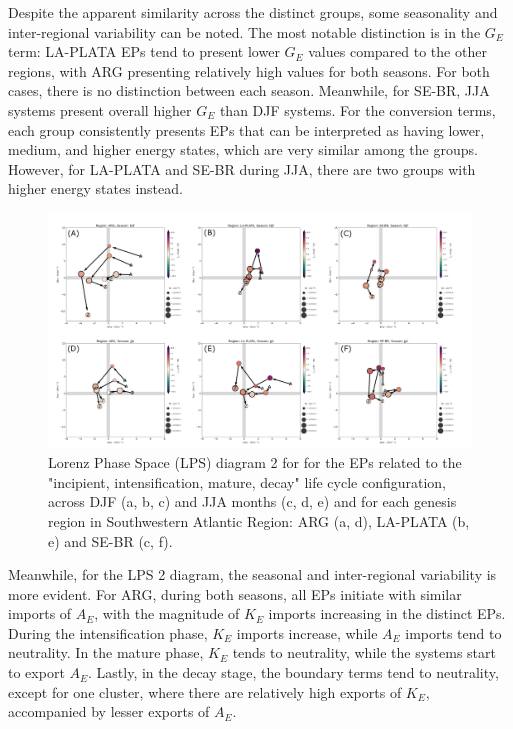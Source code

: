 Despite the apparent similarity across the distinct groups, some seasonality and inter-regional variability can be noted. The most notable distinction is in the $G_E$ term: LA-PLATA EPs tend to present lower $G_E$ values compared to the other regions, with ARG presenting relatively high values for both seasons. For both cases, there is no distinction between each season. Meanwhile, for SE-BR, JJA systems present overall higher $G_E$ than DJF systems. For the conversion terms, each group consistently presents EPs that can be interpreted as having lower, medium, and higher energy states, which are very similar among the groups. However, for LA-PLATA and SE-BR during JJA, there are two groups with higher energy states instead.

\begin{figure}[!htbp]
\centering
\includegraphics[width=\textwidth]{figs_6/lps_imports_clusters_IcItDM_seasons_regions.pdf}
\caption[LPS 2 - Clusters - Seasonality and Spatial Variability]{Lorenz Phase Space (LPS) diagram 2 for for the EPs related to the "incipient, intensification, mature, decay" life cycle configuration, across DJF (a, b, c) and JJA months (c, d, e) and for each genesis region in Southwestern Atlantic Region: ARG (a, d), LA-PLATA (b, e) and SE-BR (c, f).}
\label{fig:lps_imports_clusters_IcItDM_seasons_regions}
\end{figure}

Meanwhile, for the LPS 2 diagram, the seasonal and inter-regional variability is more evident. For ARG, during both seasons, all EPs initiate with similar imports of $A_E$, with the magnitude of $K_E$ imports increasing in the distinct EPs. During the intensification phase, $K_E$ imports increase, while $A_E$ imports tend to neutrality. In the mature phase, $K_E$ tends to neutrality, while the systems start to export $A_E$. Lastly, in the decay stage, the boundary terms tend to neutrality, except for one cluster, where there are relatively high exports of $K_E$, accompanied by lesser exports of $A_E$.

